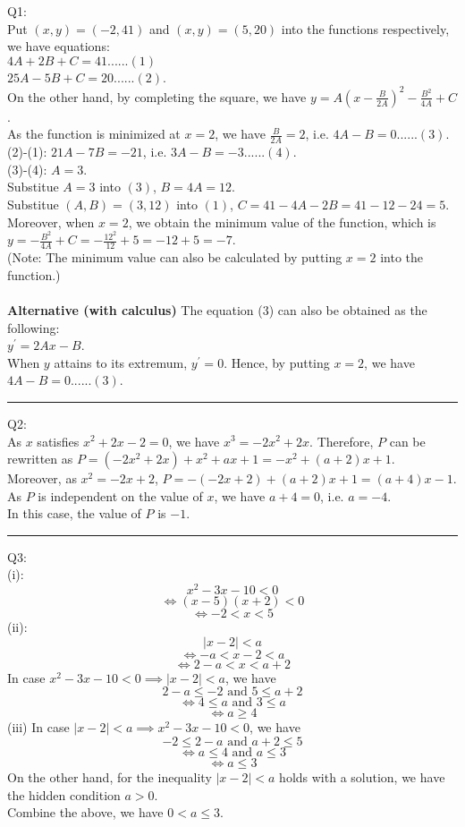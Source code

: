 \documentclass{article}
\begin{document}
\noindent Q1:\\
Put $(x,y)=(-2,41)$ and $(x,y)=(5,20)$ into the functions respectively, we have equations:\\
$4A+2B+C=41......(1)$\\
$25A-5B+C=20......(2)$.\\
On the other hand, by completing the square, we have $y=A(x-\frac{B}{2A})^2-\frac{B^2}{4A}+C$.\\
As the function is minimized at $x=2$, we have $\frac{B}{2A}=2$, i.e. $4A-B=0......(3)$.\\
(2)-(1): $21A-7B=-21$, i.e. $3A-B=-3......(4)$.\\
(3)-(4): $A=\boxed{3}$.\\
Substitue $A=3$ into $(3)$, $B=4A=\boxed{12}$.\\
Substitue $(A,B)=(3,12)$ into $(1)$, $C=41-4A-2B=41-12-24=\boxed5$.\\
Moreover, when $x=2$, we obtain the minimum value of the function, which is $y=-\frac{B^2}{4A}+C=-\frac{12^2}{12}+5=-12+5=\boxed{-7}$.\\
(Note: The minimum value can also be calculated by putting $x=2$ into the function.)\\
\\
\textbf{Alternative (with calculus)}  The equation (3) can also be obtained as the following:\\
$y^\prime=2Ax-B$.\\
When $y$ attains to its extremum, $y^\prime=0$. Hence, by putting $x=2$, we have $4A-B=0......(3)$.

\vspace{1cm}
\hrule
\vspace{1cm}

\noindent Q2:\\
As $x$ satisfies $x^2+2x-2=0$, we have $x^3=-2x^2+2x$. Therefore, $P$ can be rewritten as $P=(-2x^2+2x)+x^2+ax+1=-x^2+(a+2)x+1$.\\
Moreover, as $x^2=-2x+2$, $P=-(-2x+2)+(a+2)x+1=(a+4)x-1.$\\
As $P$ is independent on the value of $x$, we have $a+4=0$, i.e. $a=\boxed{-4}$.\\
In this case, the value of $P$ is $\boxed{-1}$.

\vspace{1cm}
\hrule
\vspace{1cm}

\noindent Q3:\\
(i): $$x^2-3x-10<0$$
$$\iff (x-5)(x+2)<0$$
$$\iff \boxed{-2<x<5}$$
(ii): $$|x-2|<a$$
$$\iff -a<x-2<a$$
$$\iff 2-a<x<a+2$$
In case $x^2-3x-10<0\implies |x-2|<a$, we have $$2-a\leq-2\text{ and }5\leq a+2$$
$$\iff 4\leq a\text{ and }3\leq a$$
$$\iff \boxed{a\geq 4}$$
(iii) In case $|x-2|<a\implies x^2-3x-10<0$, we have $$-2\leq 2-a\text{ and }a+2\leq 5$$
$$\iff a\leq 4\text{ and }a\leq 3$$
$$\iff a\leq 3$$
On the other hand, for the inequality $|x-2|<a$ holds with a solution, we have the hidden condition $a>0$.\\
Combine the above, we have $\boxed{0<a\leq3}$.
\end{document}
